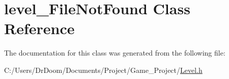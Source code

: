 \hypertarget{classlevel___file_not_found}{}\section{level\+\_\+\+File\+Not\+Found Class Reference}
\label{classlevel___file_not_found}


The documentation for this class was generated from the following file\+:\begin{DoxyCompactItemize}
\item 
C\+:/\+Users/\+Dr\+Doom/\+Documents/\+Project/\+Game\+\_\+\+Project/\hyperlink{_level_8h}{Level.\+h}\end{DoxyCompactItemize}
